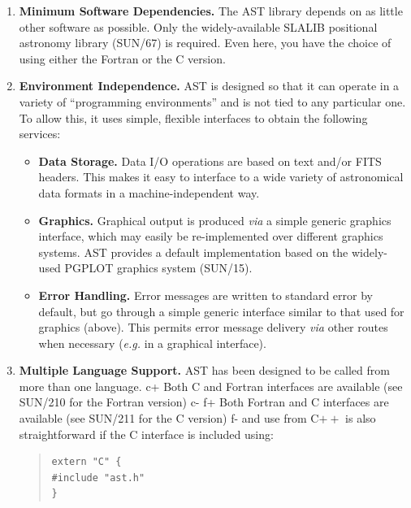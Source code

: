 \documentclass[twoside,11pt]{article}
\newcommand{\xref}[3]{#1}
\begin{document}
\begin{enumerate}
\item {\bf{Minimum Software Dependencies.}}
The AST library depends on as little other software as possible. Only
the widely-available SLALIB positional astronomy library
(\xref{SUN/67}{sun67}{}) is required. Even here, you have the choice
of using either the Fortran or the C version.

\item {\bf{Environment Independence.}}
AST is designed so that it can operate in a variety of ``programming
environments'' and is not tied to any particular one. To allow this,
it uses simple, flexible interfaces to obtain the following services:

\begin{itemize}
\item {\bf{Data Storage.}} Data I/O operations are based on text
and/or FITS headers. This makes it easy to interface to a wide variety
of astronomical data formats in a machine-independent way.

\item {\bf{Graphics.}} Graphical output is produced {\em{via}} a
simple generic graphics interface, which may easily be re-implemented
over different graphics systems. AST provides a default implementation
based on the widely-used PGPLOT graphics system
(\xref{SUN/15}{sun15}{}).

\item {\bf{Error Handling.}} Error messages are written to standard
error by default, but go through a simple generic interface similar to
that used for graphics (above). This permits error message delivery
{\em{via}} other routes when necessary ({\em{e.g.}} in a graphical
interface).
\end{itemize}

\item {\bf{Multiple Language Support.}}
AST has been designed to be called from more than one language.
c+
Both C and Fortran interfaces are available (see
\xref{SUN/210}{sun210}{} for the Fortran version)
c-
f+
Both Fortran and C interfaces are available (see
\xref{SUN/211}{sun211}{} for the C version)
f-
and use from C$++$ is also straightforward if the C interface is
included using:

\begin{quote}
\small
\begin{verbatim}
extern "C" {
#include "ast.h"
}
\end{verbatim}
\normalsize
\end{quote}


\end{enumerate}
\end{document}

